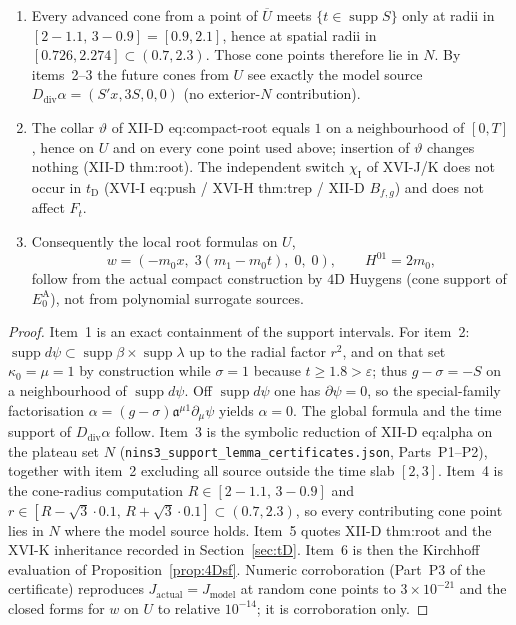 \begin{lemma}
\begin{enumerate}
  contribute no source; radial cutoff contributions of $\lambda$ during $[2,3]$
  do not meet the relevant advanced cones from $\overline U$ (item~4).
  (No claim is made that radial edges contribute no source globally.)
\item Every advanced cone from a point of $\overline U$ meets
  $\{t\in\operatorname{supp}S\}$ only at radii in $[2-1.1,\,3-0.9]=[0.9,2.1]$,
  hence at spatial radii in $[0.726,2.274]\subset(0.7,2.3)$. Those cone points
  therefore lie in $N$. By items~2--3 the future cones from $U$ see exactly the
  model source $D_{\mathrm{div}}\alpha=(S'x,3S,0,0)$ (no exterior-$N$ contribution).
\item The collar $\vartheta$ of XII-D eq:compact-root equals $1$ on a neighbourhood
  of $[0,T]$, hence on $U$ and on every cone point used above; insertion of
  $\vartheta$ changes nothing (XII-D thm:root). The independent switch
  $\chi_{\mathrm I}$ of XVI-J/K does not occur in $t_{\mathrm D}$ (XVI-I eq:push /
  XVI-H thm:trep / XII-D $B_{f,g}$) and does not affect $F_t$.
\item Consequently the local root formulas on $U$,
  \[
  w=(-m_0x,\;3(m_1-m_0t),\;0,\;0),\qquad
  H^{01}=2m_0,
  \]
  follow from the actual compact construction by $4$D Huygens (cone support of
  $E_0^{\mathrm A}$), not from polynomial surrogate sources.
\end{enumerate}
\end{lemma}
\begin{proof}
Item~1 is an exact containment of the support intervals.
For item~2: $\operatorname{supp}d\psi\subset\operatorname{supp}\beta\times\operatorname{supp}\lambda$
up to the radial factor $r^2$, and on that set $\kappa_0=\mu=1$ by construction while
$\sigma=1$ because $t\ge1.8>\varepsilon$; thus $g-\sigma=-S$ on a neighbourhood of
$\operatorname{supp}d\psi$. Off $\operatorname{supp}d\psi$ one has $\partial\psi=0$, so the
special-family factorisation $\alpha=(g-\sigma)\mathfrak a^{\mu1}\partial_\mu\psi$ yields
$\alpha=0$. The global formula and the time support of $D_{\mathrm{div}}\alpha$ follow.
Item~3 is the symbolic reduction of XII-D eq:alpha on the plateau set $N$
(\texttt{nins3\_support\_lemma\_certificates.json}, Parts~P1--P2), together with item~2
excluding all source outside the time slab $[2,3]$.
Item~4 is the cone-radius computation
$R\in[2-1.1,\,3-0.9]$ and
$r\in[R-\sqrt3\cdot0.1,\,R+\sqrt3\cdot0.1]\subset(0.7,2.3)$, so every contributing
cone point lies in $N$ where the model source holds.
Item~5 quotes XII-D thm:root and the XVI-K inheritance recorded in
Section~\ref{sec:tD}. Item~6 is then the Kirchhoff evaluation of
Proposition~\ref{prop:4Dsf}. Numeric corroboration (Part~P3 of the certificate)
reproduces $J_{\mathrm{actual}}=J_{\mathrm{model}}$ at random cone points to
$3\times10^{-21}$ and the closed forms for $w$ on $U$ to relative
$10^{-14}$; it is corroboration only.
\end{proof}
